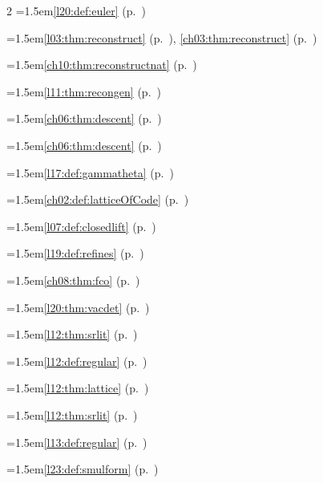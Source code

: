 \begin{multicols}{2}
\hangindent=1.5em\quad \ref{l20:def:euler} (p.~\pageref{l20:def:euler})\par
\hangindent=1.5em\quad \ref{l03:thm:reconstruct} (p.~\pageref{l03:thm:reconstruct}), \ref{ch03:thm:reconstruct} (p.~\pageref{ch03:thm:reconstruct})\par
\hangindent=1.5em\quad \ref{ch10:thm:reconstructnat} (p.~\pageref{ch10:thm:reconstructnat})\par
\hangindent=1.5em\quad \ref{l11:thm:recongen} (p.~\pageref{l11:thm:recongen})\par
\hangindent=1.5em\quad \ref{ch06:thm:descent} (p.~\pageref{ch06:thm:descent})\par
\hangindent=1.5em\quad \ref{ch06:thm:descent} (p.~\pageref{ch06:thm:descent})\par
\hangindent=1.5em\quad \ref{l17:def:gammatheta} (p.~\pageref{l17:def:gammatheta})\par
\hangindent=1.5em\quad \ref{ch02:def:latticeOfCode} (p.~\pageref{ch02:def:latticeOfCode})\par
\hangindent=1.5em\quad \ref{l07:def:closedlift} (p.~\pageref{l07:def:closedlift})\par
\hangindent=1.5em\quad \ref{l19:def:refines} (p.~\pageref{l19:def:refines})\par
\hangindent=1.5em\quad \ref{ch08:thm:fco} (p.~\pageref{ch08:thm:fco})\par
\hangindent=1.5em\quad \ref{l20:thm:vacdet} (p.~\pageref{l20:thm:vacdet})\par
\hangindent=1.5em\quad \ref{l12:thm:srlit} (p.~\pageref{l12:thm:srlit})\par
\hangindent=1.5em\quad \ref{l12:def:regular} (p.~\pageref{l12:def:regular})\par
\hangindent=1.5em\quad \ref{l12:thm:lattice} (p.~\pageref{l12:thm:lattice})\par
\hangindent=1.5em\quad \ref{l12:thm:srlit} (p.~\pageref{l12:thm:srlit})\par
\hangindent=1.5em\quad \ref{l13:def:regular} (p.~\pageref{l13:def:regular})\par
\hangindent=1.5em\quad \ref{l23:def:smulform} (p.~\pageref{l23:def:smulform})\par

\end{multicols}
